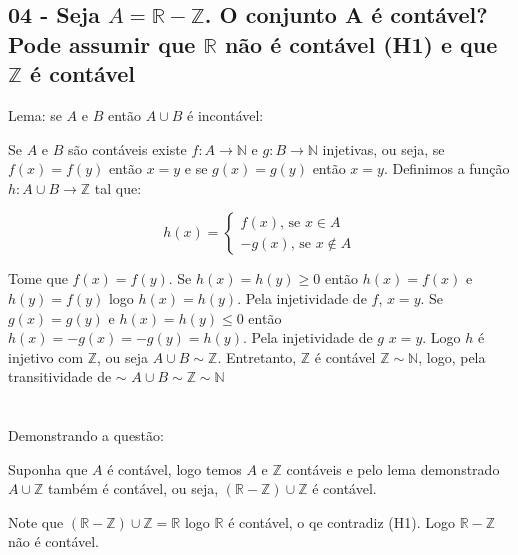 \subsection*{
04 - Seja $ A = \mathbb{R} - \mathbb{Z} $. O conjunto A é contável?
\\
Pode assumir que $\mathbb{R}$ não é contável (H1) e que $ \mathbb{Z} $ é contável
}

Lema: se $ A $ e $ B $ então $ A \cup B $ é incontável:

Se $ A $ e $ B $ são contáveis existe $ f \colon A \to \mathbb{N} $ e $ g \colon B \to \mathbb{N} $ injetivas, ou seja, se $ f(x) = f(y) $ então $ x = y $ e se $ g(x) = g(y) $ então $ x = y $. Definimos a função $ h \colon A \cup B \to \mathbb{Z} $ tal que:

\[   
h(x) = 
\begin{cases}
	f(x) \text{, se } x \in A \\
	-g(x) \text{, se } x \notin A
\end{cases}
\]

Tome que $ f(x) = f(y) $. Se $ h(x) = h(y) \geq 0 $ então $ h(x) = f(x) $ e $ h(y) = f(y) $ logo $ h(x) = h(y) $. Pela injetividade de $ f $, $ x = y $. Se $ g(x) = g(y) $ e $ h(x) = h(y) \leq 0 $ então $ h(x) = -g(x) = -g(y) = h(y) $. Pela injetividade de $ g $ $ x = y $. Logo $ h $ é injetivo com $ \mathbb{Z} $, ou seja $ A \cup B \sim \mathbb{Z} $. Entretanto, $ \mathbb{Z} $ é contável $ \mathbb{Z} \sim \mathbb{N} $, logo, pela transitividade de $ \sim $ $ A \cup B \sim \mathbb{Z} \sim \mathbb{N} $
\\~\\~\\
Demonstrando a questão:

Suponha que $ A $ é contável, logo temos $ A $ e $ \mathbb{Z} $ contáveis e pelo lema demonstrado $ A \cup \mathbb{Z} $ também é contável, ou seja, $ (\mathbb{R} - \mathbb{Z}) \cup \mathbb{Z} $ é contável.

Note que $ (\mathbb{R} - \mathbb{Z}) \cup \mathbb{Z} = \mathbb{R} $ logo $ \mathbb{R} $ é contável, o qe contradiz (H1). Logo $ \mathbb{R} - \mathbb{Z} $ não é contável. 
